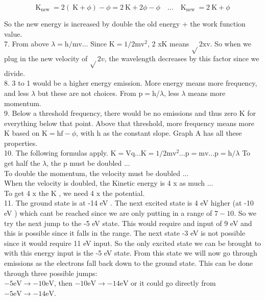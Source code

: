 \begin{enumerate}
$$
\mathrm{K}_{\text {new }}=2(\mathrm{~K}+\phi)-\phi=2 \mathrm{~K}+2 \phi-\phi \quad \ldots \quad \mathrm{K}_{\text {new }}=2 \mathrm{~K}+\phi
$$

So the new energy is increased by double the old energy + the work function value.\\
7. From above $\lambda=\mathrm{h} / \mathrm{mv}$... Since $\mathrm{K}=1 / 2 \mathrm{mv}^{2}$, 2 xK means $\sqrt{ } 2 \mathrm{xv}$. So when we plug in the new velocity of $\sqrt{ } 2 v$, the wavelength decreases by this factor since we divide.\\
8. 3 to 1 would be a higher energy emission. More energy means more frequency, and less $\lambda$ but these are not choices. From $\mathrm{p}=\mathrm{h} / \lambda$, less $\lambda$ means more momentum.\\
9. Below a threshold frequency, there would be no emissions and thus zero K for everything below that point. Above that threshold, more frequency means more K based on $\mathrm{K}=\mathrm{hf}-\phi$, with h as the constant slope. Graph A has all these properties.\\
10. The following formulas apply. $\mathrm{K}=\mathrm{Vq} \ldots \mathrm{K}=1 / 2 \mathrm{mv}^{2} \ldots \mathrm{p}=\mathrm{mv} \ldots \mathrm{p}=\mathrm{h} / \lambda$ To get half the $\lambda$, the p must be doubled ...\\
To double the momentum, the velocity must be doubled ...\\
When the velocity is doubled, the Kinetic energy is 4 x as much ...\\
To get 4 x the K , we need 4 x the potential.\\
11. The ground state is at -14 eV . The next excited state is 4 eV higher (at -10 eV ) which cant be reached since we are only putting in a range of $7-10$. So we try the next jump to the -5 eV state. This would require and input of 9 eV and this is possible since it falls in the range. The next state -3 eV is not possible since it would require 11 eV input. So the only excited state we can be brought to with this energy input is the -5 eV state. From this state we will now go through\\
emissions as the electrons fall back down to the ground state. This can be done through three possible jumps:\\
$-5 \mathrm{eV} \rightarrow-10 \mathrm{eV}$, then $-10 \mathrm{eV} \rightarrow-14 \mathrm{eV}$ or it could go directly from $-5 \mathrm{eV} \rightarrow-14 \mathrm{eV}$.\\

\end{enumerate}
